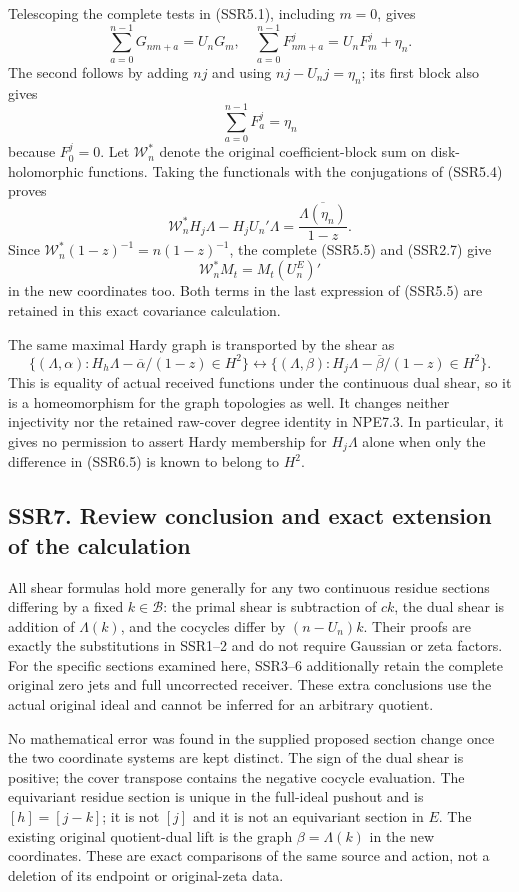 Telescoping the complete tests in (SSR5.1), including \(m=0\), gives \[
\sum_{a=0}^{n-1}G_{nm+a}=U_nG_m,
\quad
\sum_{a=0}^{n-1}F_{nm+a}^j=U_nF_m^j+\eta_n.
\tag{SSR6.1}
\] The second follows by adding \(nj\) and using \(nj-U_nj=\eta_n\); its
first block also gives \[
\sum_{a=0}^{n-1}F_a^j=\eta_n
\tag{SSR6.2}
\] because \(F_0^j=0\). Let \(\mathscr W_n^*\) denote the original
coefficient-block sum on disk-holomorphic functions. Taking the
functionals with the conjugations of (SSR5.4) proves \[
\mathscr W_n^*H_j\Lambda-H_jU_n'\Lambda
=\frac{\overline{\Lambda(\eta_n)}}{1-z}.
\tag{SSR6.3}
\] Since \(\mathscr W_n^*(1-z)^{-1}=n(1-z)^{-1}\), the complete (SSR5.5)
and (SSR2.7) give \[
\mathscr W_n^*M_t=M_t(U_n^E)'
\tag{SSR6.4}
\] in the new coordinates too. Both terms in the last expression of
(SSR5.5) are retained in this exact covariance calculation.

The same maximal Hardy graph is transported by the shear as \[
\{(\Lambda,\alpha):H_h\Lambda-\overline\alpha/(1-z)\in H^2\}
\longleftrightarrow
\{(\Lambda,\beta):H_j\Lambda-\overline\beta/(1-z)\in H^2\}.
\tag{SSR6.5}
\] This is equality of actual received functions under the continuous
dual shear, so it is a homeomorphism for the graph topologies as well.
It changes neither injectivity nor the retained raw-cover degree
identity in NPE7.3. In particular, it gives no permission to assert
Hardy membership for \(H_j\Lambda\) alone when only the difference in
(SSR6.5) is known to belong to \(H^2\).

\subsection{SSR7. Review conclusion and exact extension of the
calculation}\label{ssr7.-review-conclusion-and-exact-extension-of-the-calculation}

All shear formulas hold more generally for any two continuous residue
sections differing by a fixed \(k\in\mathcal B\): the primal shear is
subtraction of \(ck\), the dual shear is addition of \(\Lambda(k)\), and
the cocycles differ by \((n-U_n)k\). Their proofs are exactly the
substitutions in SSR1--2 and do not require Gaussian or zeta factors.
For the specific sections examined here, SSR3--6 additionally retain the
complete original zero jets and full uncorrected receiver. These extra
conclusions use the actual original ideal and cannot be inferred for an
arbitrary quotient.

No mathematical error was found in the supplied proposed section change
once the two coordinate systems are kept distinct. The sign of the dual
shear is positive; the cover transpose contains the negative cocycle
evaluation. The equivariant residue section is unique in the full-ideal
pushout and is \([h]=[j-k]\); it is not \([j]\) and it is not an
equivariant section in \(E\). The existing original quotient-dual lift
is the graph \(\beta=\Lambda(k)\) in the new coordinates. These are
exact comparisons of the same source and action, not a deletion of its
endpoint or original-zeta data.
